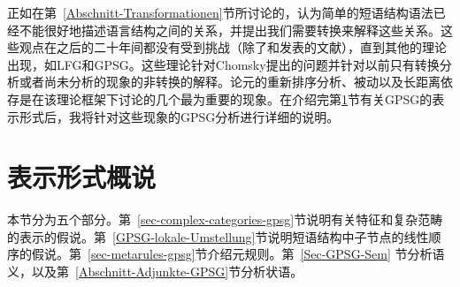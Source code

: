 正如在第~\ref{Abschnitt-Transformationen}节所讨论的，\citet{Chomsky57a}认为简单的短语结构语法已经不能很好地描述语言结构之间的关系，并提出我们需要转换来解释这些关系。这些观点在之后的二十年间都没有受到挑战（除了和发表的文献），直到其他的理论出现，如LFG和GPSG。这些理论针对Chomsky提出的问题并针对以前只有转换分析或者尚未分析的现象的非转换的解释。论元的重新排序分析、被动以及长距离依存是在该理论框架下讨论的几个最为重要的现象。在介绍完第\ref{sec-Representationsformat}节有关GPSG的表示形式后，我将针对这些现象的GPSG分析进行详细的说明。

\section{表示形式概说}
\label{sec-Representationsformat}

本节分为五个部分。第~\ref{sec-complex-categories-gpsg}节说明有关特征和复杂范畴的表示的假说。第~\ref{GPSG-lokale-Umstellung}节说明短语结构中子节点的线性顺序的假说。第~\ref{sec-metarules-gpsg}节介绍元规则。第~\ref{Sec-GPSG-Sem} 节分析语义，以及第~\ref{Abschnitt-Adjunkte-GPSG}节分析状语。

